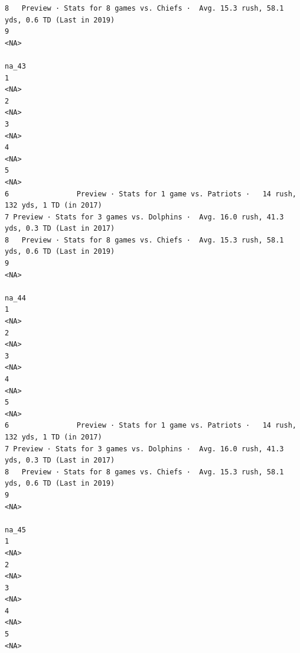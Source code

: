 \documentclass[
]{article}
\begin{document}
\begin{verbatim}
8   Preview · Stats for 8 games vs. Chiefs ·  Avg. 15.3 rush, 58.1 yds, 0.6 TD (Last in 2019)
9                                                                                        <NA>
                                                                                        na_43
1                                                                                        <NA>
2                                                                                        <NA>
3                                                                                        <NA>
4                                                                                        <NA>
5                                                                                        <NA>
6                Preview · Stats for 1 game vs. Patriots ·   14 rush, 132 yds, 1 TD (in 2017)
7 Preview · Stats for 3 games vs. Dolphins ·  Avg. 16.0 rush, 41.3 yds, 0.3 TD (Last in 2017)
8   Preview · Stats for 8 games vs. Chiefs ·  Avg. 15.3 rush, 58.1 yds, 0.6 TD (Last in 2019)
9                                                                                        <NA>
                                                                                        na_44
1                                                                                        <NA>
2                                                                                        <NA>
3                                                                                        <NA>
4                                                                                        <NA>
5                                                                                        <NA>
6                Preview · Stats for 1 game vs. Patriots ·   14 rush, 132 yds, 1 TD (in 2017)
7 Preview · Stats for 3 games vs. Dolphins ·  Avg. 16.0 rush, 41.3 yds, 0.3 TD (Last in 2017)
8   Preview · Stats for 8 games vs. Chiefs ·  Avg. 15.3 rush, 58.1 yds, 0.6 TD (Last in 2019)
9                                                                                        <NA>
                                                                                        na_45
1                                                                                        <NA>
2                                                                                        <NA>
3                                                                                        <NA>
4                                                                                        <NA>
5                                                                                        <NA>

\end{verbatim}
\end{document}
